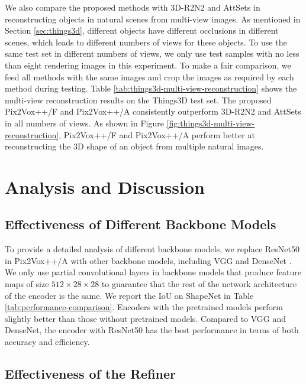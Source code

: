 \documentclass[twocolumn]{svjour3}
\begin{document}
We also compare the proposed methods with 3D-R2N2 \citep{DBLP:conf/eccv/ChoyXGCS16} and AttSets \citep{DBLP:journals/ijcv/YangSAN19} in reconstructing objects in natural scenes from multi-view images.
As mentioned in Section \ref{sec:things3d}, different objects have different occlusions in different scenes, which leads to different numbers of views for these objects.
To use the same test set in different numbers of views, we only use test samples with no less than eight rendering images in this experiment.
To make a fair comparison, we feed all methods with the same images and crop the images as required by each method during testing.
Table \ref{tab:things3d-multi-view-reconstruction} shows the multi-view reconstruction results on the Things3D test set.
The proposed Pix2Vox++/F and Pix2Vox++/A consistently outperform 3D-R2N2 and AttSets in all numbers of views.
As shown in Figure \ref{fig:things3d-multi-view-reconstruction}, Pix2Vox++/F and Pix2Vox++/A perform better at reconstructing the 3D shape of an object from multiple natural images.


\section{Analysis and Discussion}

\subsection{Effectiveness of Different Backbone Models}
 
To provide a detailed analysis of different backbone models, we replace ResNet50 in Pix2Vox++/A with other backbone models, including VGG \citep{DBLP:conf/iclr/SimonyanZ14a} and DenseNet \citep{DBLP:conf/cvpr/HuangLMW17}.
We only use partial convolutional layers in backbone models that produce feature maps of size $512 \times 28 \times 28$ to guarantee that the rest of the network architecture of the encoder is the same.
We report the IoU on ShapeNet in Table \ref{tab:performance-comparison}.
Encoders with the pretrained models perform slightly better than those without pretrained models.
Compared to VGG and DenseNet, the encoder with ResNet50 has the best performance in terms of both accuracy and efficiency.

\subsection{Effectiveness of the Refiner}
\end{document}
